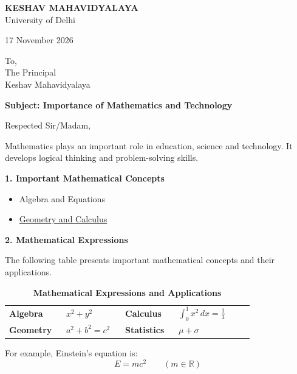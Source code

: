 \documentclass[11pt,a4paper]{article}
\begin{document}
\begin{center}
{\Large\bfseries KESHAV MAHAVIDYALAYA}\\[-2pt]
{\normalsize University of Delhi}
\end{center}

\vspace{8pt}
17 November 2026

\vspace{8pt}
To,\\
The Principal\\
Keshav Mahavidyalaya

\textbf{Subject: Importance of Mathematics and Technology}

Respected Sir/Madam,

Mathematics plays an important role in education, science and technology.
It develops logical thinking and problem-solving skills.

\textbf{1. Important Mathematical Concepts}
\begin{itemize}
\item Algebra and Equations
\item \underline{Geometry and Calculus}
\end{itemize}

\textbf{2. Mathematical Expressions}

The following table presents important mathematical concepts and their applications.

\begin{table}[ht]
\centering
\small
\caption{\textbf{Mathematical Expressions and Applications}}
\label{tab:math-applications}
\begin{tabular}{|>{\raggedright\arraybackslash}p{0.17\linewidth}|
                >{\centering\arraybackslash}p{0.19\linewidth}|
                >{\raggedright\arraybackslash}p{0.17\linewidth}|
                >{\centering\arraybackslash}p{0.27\linewidth}|}
\hline
\multicolumn{4}{|c|}{\textbf{Mathematical Concepts and Applications}}\\
\hline
\textbf{Algebra} & \(x^2+y^2\) & \textbf{Calculus} &
\(\displaystyle\int_0^1 x^2\,dx=\frac{1}{3}\)\\
\hline
\textbf{Geometry} & \(a^2+b^2=c^2\) & \textbf{Statistics} &
\(\mu+\sigma\)\\
\hline
\end{tabular}
\end{table}

For example, Einstein's equation is:
\[
E=mc^2 \qquad (m\in\mathbb{R})
\]
\end{document}
